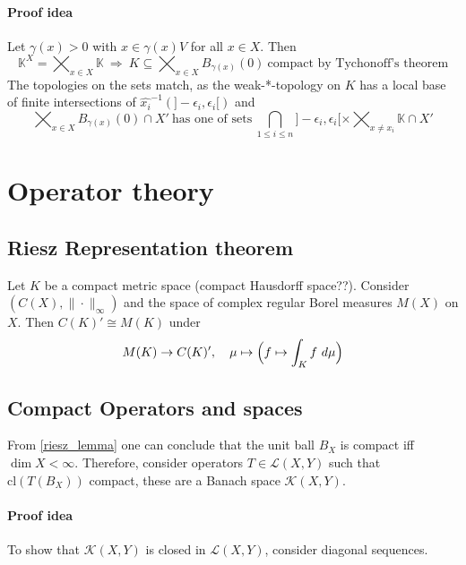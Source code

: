 \documentclass{scrartcl}
\begin{document}
\paragraph{Proof idea} Let $\gamma(x) > 0$ with $x \in \gamma(x)V$ for all $x \in X$. Then
\begin{equation}
    \mathbb{K}^X = \bigtimes_{x \in X} \mathbb{K} \ \Rightarrow \ K \subseteq \bigtimes_{x \in X} B_{\gamma(x)}(0) \ \text{compact by Tychonoff's theorem}\nonumber
\end{equation}
The topologies on the sets match, as the weak-*-topology on $K$ has a local base of finite intersections of $\hat{x_i}^{-1}(]-\epsilon_i, \epsilon_i[)$ and 
\begin{equation}
    \bigtimes_{x \in X} B_{\gamma(x)}(0) \cap X' \ \text{has one of sets} \ \bigcap_{1 \leq i \leq n} ]-\epsilon_i, \epsilon_i[ \times \bigtimes_{x \neq x_i} \mathbb{K} \cap X' \nonumber
\end{equation}

\section{Operator theory}

\subsection{Riesz Representation theorem}
Let $K$ be a compact metric space (compact Hausdorff space??). Consider $(C(X), \|\cdot\|_\infty)$ and the space of complex regular Borel measures $M(X)$ on $X$. Then $C(K)' \cong M(K)$ under
\begin{equation*}
    M(K) \to C(K)', \quad \mu \mapsto \Bigl(f \mapsto \int_K f \ d\mu\Bigr)
\end{equation*}

\subsection{Compact Operators and spaces}
From \ref{riesz_lemma} one can conclude that the unit ball $B_X$ is compact iff $\dim X < \infty$. Therefore, consider operators $T \in \mathcal{L}(X, Y)$ such that $\mathrm{cl}(T(B_X))$ compact, these are a Banach space $\mathcal{K}(X, Y)$.
\paragraph{Proof idea} To show that $\mathcal{K}(X, Y)$ is closed in $\mathcal{L}(X, Y)$, consider diagonal sequences.
\end{document}
